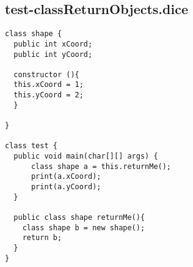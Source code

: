 \subsection{test-classReturnObjects.dice}
\begin{verbatim}
class shape {
  public int xCoord;
  public int yCoord;

  constructor (){
  this.xCoord = 1;
  this.yCoord = 2;
  }

}

class test {
  public void main(char[][] args) {
      class shape a = this.returnMe();
      print(a.xCoord);
      print(a.yCoord);
  }

  public class shape returnMe(){
    class shape b = new shape();
    return b;
  }
}
\end{verbatim}